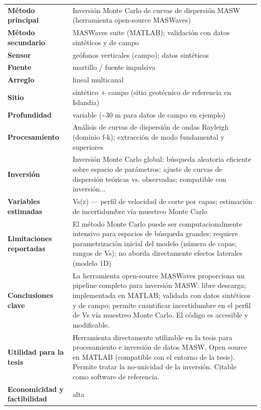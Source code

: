 \begin{center}\scriptsize
\begin{tabularx}{\textwidth}{@{}>{\bfseries}p{3.3cm} X@{}}
\toprule
M\'etodo principal & Inversión Monte Carlo de curvas de dispersión MASW (herramienta open-source MASWaves) \\
M\'etodo secundario & MASWaves suite (MATLAB); validación con datos sintéticos y de campo \\
Sensor & geófonos verticales (campo); datos sintéticos \\
Fuente & martillo / fuente impulsiva \\
Arreglo & lineal multicanal \\
Sitio & sintético + campo (sitio geotécnico de referencia en Islandia) \\
Profundidad & variable (\textasciitilde{}30 m para datos de campo en ejemplo) \\
Procesamiento & Análisis de curvas de dispersión de ondas Rayleigh (dominio f-k); extracción de modo fundamental y superiores \\
Inversi\'on & Inversión Monte Carlo global: búsqueda aleatoria eficiente sobre espacio de parámetros; ajuste de curvas de dispersión teóricas vs. observadas; compatible con inversión... \\
Variables estimadas & Vs(z) --- perfil de velocidad de corte por capas; estimación de incertidumbre vía muestreo Monte Carlo \\
Limitaciones reportadas & El método Monte Carlo puede ser computacionalmente intensivo para espacios de búsqueda grandes; requiere parametrización inicial del modelo (número de capas; rangos de Vs); no aborda directamente efectos laterales (modelo 1D) \\
Conclusiones clave & La herramienta open-source MASWaves proporciona un pipeline completo para inversión MASW: libre descarga; implementada en MATLAB; validada con datos sintéticos y de campo; permite cuantificar incertidumbre en el perfil de Vs vía muestreo Monte Carlo. El código es accesible y modificable. \\
Utilidad para la tesis & Herramienta directamente utilizable en la tesis para procesamiento e inversión de datos MASW. Open source en MATLAB (compatible con el entorno de la tesis). Permite tratar la no-unicidad de la inversión. Citable como software de referencia. \\
Economicidad y factibilidad & alta \\
\bottomrule
\end{tabularx}
\end{center}

